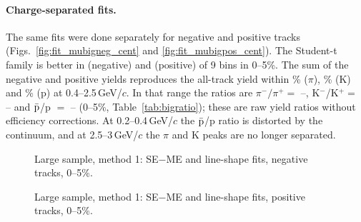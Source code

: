 
\paragraph{Charge-separated fits.} The same fits were done separately for negative and positive tracks
(Figs.~\ref{fig:fit_mubigneg_cent} and \ref{fig:fit_mubigpos_cent}). The Student-t family is better in \bigFitNegTfamCi{} (negative)
and \bigFitPosTfamCi{} (positive) of 9 bins in 0--5\%. The sum of the negative and positive yields reproduces the all-track yield
within \bigClosPiDev\% ($\pi$), \bigClosKDev\% (K) and \bigClosPDev\% (p) at 0.4--2.5\,GeV/$c$. In that range the ratios are
$\pi^-/\pi^+ = $ \bigRatPiMin--\bigRatPiMax, K$^-$/K$^+ = $ \bigRatKMin--\bigRatKMax{} and $\bar{\rm p}$/p $=$ \bigRatPMin--\bigRatPMax{}
(0--5\%, Table~\ref{tab:bigratio}); these are raw yield ratios without efficiency corrections. At 0.2--0.4\,GeV/$c$ the
$\bar{\rm p}$/p ratio is distorted by the continuum, and at 2.5--3\,GeV/$c$ the $\pi$ and K peaks are no longer separated.



\begin{figure}[H]
\centering
{}
\caption{Large sample, method 1: SE$-$ME and line-shape fits, negative tracks, 0--5\%.}
\end{figure}

\begin{figure}[H]
\centering
{}
\caption{Large sample, method 1: SE$-$ME and line-shape fits, positive tracks, 0--5\%.}
\end{figure}
